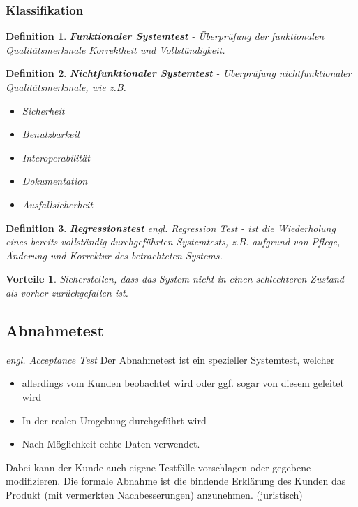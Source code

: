 \documentclass[a4paper]{article}
\theoremstyle{break}
\newtheorem{defi}{Definition}[section]
\newtheorem{why}{Vorteile}[section]
\begin{document}
          \subsubsection{Klassifikation}
          \begin{defi}
            \textbf{Funktionaler Systemtest} - Überprüfung der funktionalen Qualitätsmerkmale Korrektheit und Vollständigkeit.
          \end{defi}
          \begin{defi}
            \textbf{Nichtfunktionaler Systemtest} - Überprüfung nichtfunktionaler Qualitätsmerkmale, wie z.B.
            \begin{itemize}
            \item Sicherheit
            \item Benutzbarkeit
            \item Interoperabilität
            \item Dokumentation
            \item Ausfallsicherheit
            \end{itemize}
          \end{defi}


          \begin{defi}
            \textbf{Regressionstest} \textit{engl. Regression Test} - ist die Wiederholung eines bereits vollständig durchgeführten Systemtests, z.B. aufgrund von Pflege, Änderung und Korrektur des betrachteten Systems.
          \end{defi}

          \begin{why}
            Sicherstellen, dass das System nicht in einen schlechteren Zustand als vorher zurückgefallen ist.
          \end{why}
          
          \subsection{Abnahmetest}
          \textit{engl. Acceptance Test}
          Der Abnahmetest ist ein spezieller Systemtest, welcher
          \begin{itemize}
          \item allerdings vom Kunden beobachtet wird oder ggf. sogar von diesem geleitet wird
          \item In der realen Umgebung durchgeführt wird
          \item Nach Möglichkeit echte Daten verwendet.
          \end{itemize}
          \begin{flushleft}
          Dabei kann der Kunde auch eigene Testfälle vorschlagen oder gegebene modifizieren.
          Die formale Abnahme ist die bindende Erklärung des Kunden das Produkt (mit vermerkten Nachbesserungen) anzunehmen. (juristisch)
          \end{flushleft}
          
\end{document}
